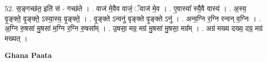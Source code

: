 \documentclass[17pt]{extarticle}
\begin{document}
52. स॒ङ्गच्छ॑त॒ इति॑ सं - गच्छ॑ते । . वाज॑ मे॒वैव वाजं॒ ॅवाज॑ मे॒व । . ए॒वास्या᳚ स्यै॒वै वास्य॑ । . अ॒स्य॒ वृ॒ङ्क्ते॒ वृ॒ङ्क्ते॒ ऽस्या॒स्य॒ वृ॒ङ्क्ते॒ । . वृ॒ङ्क्ते ऽन्वनु॑ वृङ्क्ते वृ॒ङ्क्ते ऽनु॑ । . अन्व॒ग्नि र॒ग्नि रन्वन् व॒ग्निः । . अ॒ग्नि रु॒षसा॑ मु॒षसा॑ म॒ग्नि र॒ग्नि रु॒षसा᳚म् । . उ॒षसा॒ मग्र॒ मग्र॑ मु॒षसा॑ मु॒षसा॒ मग्र᳚म् । . अग्र॑ मख्य दख्य॒ दग्र॒ मग्र॑ मख्यत् । \newline

\textbf{Ghana Paata } \newline
\end{document}
